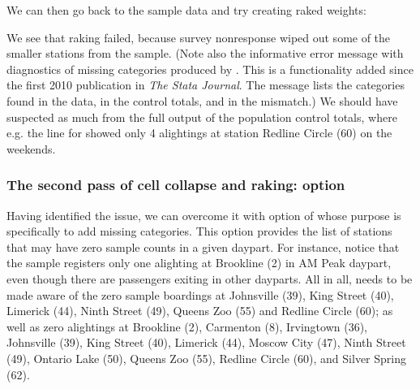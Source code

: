 \begin{stlog}
\nullskip
\end{stlog}

We can then go back to the sample data and try creating raked weights:

\begin{stlog}
\nullskip
\end{stlog}

We see that raking failed, because survey nonresponse wiped out some of the smaller
stations from the sample. (Note also the informative error message with
diagnostics of missing categories produced by . This is a functionality
added since the first 2010 publication in \textit{The Stata Journal}. The message lists
the categories found in the data, in the control totals, and in the mismatch.)
We should have suspected
as much from the full output of the population control totals, where e.g. the line
for  showed only 4 alightings at station Redline Circle (60)
on the weekends.

\subsubsection{The second pass of cell collapse and raking:  option}

Having identified the issue, we can overcome it with  option
of  whose purpose is specifically to add missing categories.
This option provides the list of stations that may have zero sample counts
in a given daypart.
For instance, notice that the sample registers only one alighting at Brookline (2)
in AM Peak daypart, even though there are passengers exiting in other dayparts. All in all,
 needs to be made aware of the zero sample boardings at
Johnsville (39), King Street (40), Limerick (44), Ninth Street (49),
Queens Zoo (55) and Redline Circle (60); as well as zero alightings at Brookline (2),
Carmenton (8), Irvingtown (36),
Johnsville (39), King Street (40), Limerick (44), Moscow City (47), Ninth Street (49),
Ontario Lake (50), Queens Zoo (55), Redline Circle (60), and Silver Spring (62).

\cnp

\begin{stlog}
\nullskip
\end{stlog}


